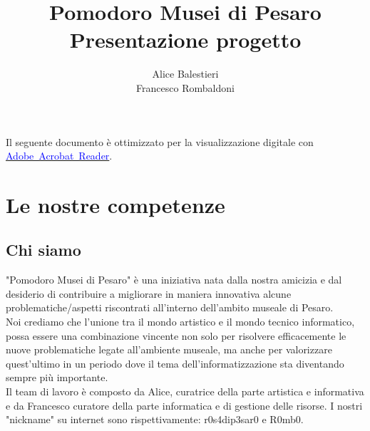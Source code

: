 \documentclass[hidelinks,12pt,a4paper]{article}
\begin{document}
	\begin{flushleft}
		
		\title{\textbf{Pomodoro Musei di Pesaro}\\\small{Presentazione progetto}}
		\author{Alice Balestieri\\ Francesco Rombaldoni}
		\date{}
		
		\maketitle
		
		\begin{adjustwidth}{-30mm}{-30mm}
			\vspace*{\fill}
			\centering
			\fboxrule=2pt
			\fbox
			{
				\begin{minipage}{0.85\linewidth}
					Il seguente documento è ottimizzato per la visualizzazione digitale con \href{https://get.adobe.com/it/reader/}{\textcolor{blue}{Adobe~Acrobat~Reader}}.  
				\end{minipage}
			}
		\end{adjustwidth}
		
		\setcounter{page}{1}
		\newpage
		\tableofcontents
		\newpage
		
		\section{Le nostre competenze}
		\subsection{Chi siamo}
		"Pomodoro Musei di Pesaro" è una iniziativa nata dalla nostra amicizia e dal desiderio di contribuire a migliorare in maniera innovativa alcune problematiche/aspetti riscontrati all'interno dell'ambito museale di Pesaro.\\
		Noi crediamo che l'unione tra il mondo artistico e il mondo tecnico informatico, possa essere una combinazione vincente non solo per risolvere efficacemente le nuove problematiche legate all'ambiente museale, ma anche per valorizzare quest'ultimo in un periodo dove il tema dell'informatizzazione sta diventando sempre più importante.\\
		Il team di lavoro è composto da Alice, curatrice della parte artistica e informativa e da Francesco curatore della parte informatica e di gestione delle risorse. I nostri "nickname" su internet sono rispettivamente: r0s4dip3sar0 e R0mb0. 
		

\end{flushleft}
\end{document}
